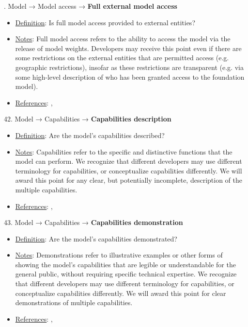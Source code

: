 . Model → Model access → \textbf{Full external model access}
\vspace{-\parskip}
\begin{itemize}
\item
\underline{Definition}: Is full model access provided to external entities?
\item
\underline{Notes}: Full model access refers to the ability to access the model via the release of model weights. Developers may receive this point even if there are some restrictions on the external entities that are permitted access (e.g. geographic restrictions), insofar as these restrictions are transparent (e.g. via some high-level description of who has been granted access to the foundation model).
\item
\underline{References}: \citet{solaiman2023gradient}, \citet{shevlane2022structured}
\end{itemize} \vspace{\baselineskip}


42. Model → Capabilities → \textbf{Capabilities description}
\vspace{-\parskip}
\begin{itemize}
\item
\underline{Definition}: Are the model's capabilities described?
\item
\underline{Notes}: Capabilities refer to the specific and distinctive functions that the model can perform. We recognize that different developers may use different terminology for capabilities, or conceptualize capabilities differently. We will award this point for any clear, but potentially incomplete, description of the multiple capabilities.
\item
\underline{References}: \citet{srivastava2022bigbench}, \citet{liang2022helm}
\end{itemize} \vspace{\baselineskip}


43. Model → Capabilities → \textbf{Capabilities demonstration}
\vspace{-\parskip}
\begin{itemize}
\item
\underline{Definition}: Are the model’s capabilities demonstrated?
\item
\underline{Notes}: Demonstrations refer to illustrative examples or other forms of showing the model's capabilities that are legible or understandable for the general public, without requiring specific technical expertise. We recognize that different developers may use different terminology for capabilities, or conceptualize capabilities differently. We will award this point for clear demonstrations of multiple capabilities.
\item
\underline{References}: \citet{srivastava2022bigbench}, \citet{liang2022helm}
\end{itemize} \vspace{\baselineskip}



